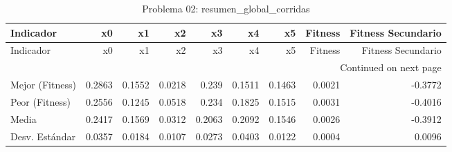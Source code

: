 \begin{longtable}{lrrrrrrrr}
\caption{Problema 02: resumen\_global\_corridas}\label{tab:resumen_global_corridas} \\
\toprule
Indicador & x0 & x1 & x2 & x3 & x4 & x5 & Fitness & Fitness Secundario \\
\midrule
\endfirsthead
\toprule
Indicador & x0 & x1 & x2 & x3 & x4 & x5 & Fitness & Fitness Secundario \\
\midrule
\endhead
\midrule
\multicolumn{9}{r}{Continued on next page} \\
\midrule
\endfoot
\bottomrule
\endlastfoot
Mejor (Fitness) & 0.2863 & 0.1552 & 0.0218 & 0.239 & 0.1511 & 0.1463 & 0.0021 & -0.3772 \\
Peor (Fitness) & 0.2556 & 0.1245 & 0.0518 & 0.234 & 0.1825 & 0.1515 & 0.0031 & -0.4016 \\
Media & 0.2417 & 0.1569 & 0.0312 & 0.2063 & 0.2092 & 0.1546 & 0.0026 & -0.3912 \\
Desv. Estándar & 0.0357 & 0.0184 & 0.0107 & 0.0273 & 0.0403 & 0.0122 & 0.0004 & 0.0096 \\
\end{longtable}